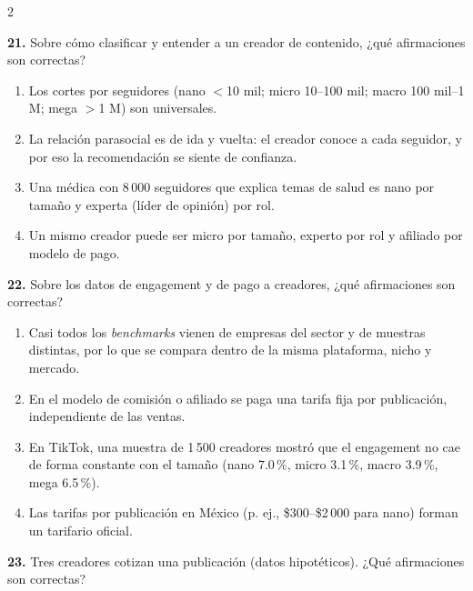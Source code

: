 \documentclass[10pt,letterpaper]{article}
\newcommand{\cas}{\framebox[1.0em]{\rule{0pt}{1.05ex}}}
\begin{document}
\begin{multicols}{2}
\begin{minipage}[t]{\columnwidth}\noindent\textbf{21.} Sobre cómo clasificar y entender a un creador de contenido, ¿qué afirmaciones son correctas?
\vspace{1pt}\begin{enumerate}[label=\cas\ \alph*),leftmargin=2.3em,itemsep=1.2pt,topsep=1pt,parsep=0pt,partopsep=0pt]
\item Los cortes por seguidores (nano $<$10 mil; micro 10--100 mil; macro 100 mil--1 M; mega $>$1 M) son universales.
\item La relación parasocial es de ida y vuelta: el creador conoce a cada seguidor, y por eso la recomendación se siente de confianza.
\item Una médica con 8\,000 seguidores que explica temas de salud es nano por tamaño y experta (líder de opinión) por rol.
\item Un mismo creador puede ser micro por tamaño, experto por rol y afiliado por modelo de pago.
\end{enumerate}\end{minipage}\par\vspace{3pt}
\begin{minipage}[t]{\columnwidth}\noindent\textbf{22.} Sobre los datos de engagement y de pago a creadores, ¿qué afirmaciones son correctas?
\vspace{1pt}\begin{enumerate}[label=\cas\ \alph*),leftmargin=2.3em,itemsep=1.2pt,topsep=1pt,parsep=0pt,partopsep=0pt]
\item Casi todos los \textit{benchmarks} vienen de empresas del sector y de muestras distintas, por lo que se compara dentro de la misma plataforma, nicho y mercado.
\item En el modelo de comisión o afiliado se paga una tarifa fija por publicación, independiente de las ventas.
\item En TikTok, una muestra de 1\,500 creadores mostró que el engagement no cae de forma constante con el tamaño (nano 7.0\,\%, micro 3.1\,\%, macro 3.9\,\%, mega 6.5\,\%).
\item Las tarifas por publicación en México (p. ej., \$300--\$2\,000 para nano) forman un tarifario oficial.
\end{enumerate}\end{minipage}\par\vspace{3pt}
\begin{minipage}[t]{\columnwidth}\noindent\textbf{23.} Tres creadores cotizan una publicación (datos hipotéticos). ¿Qué afirmaciones son correctas?

\end{minipage}
\end{multicols}
\end{document}
